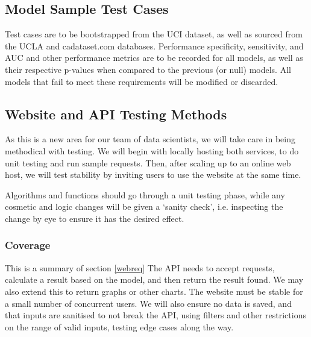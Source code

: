 \documentclass[a4paper, 12pt]{article}
\begin{document}
    \subsection{Model Sample Test Cases}
    Test cases are to be bootstrapped from the UCI dataset, as well as sourced from the UCLA and cadataset.com databases. Performance specificity, sensitivity, and AUC and other performance metrics are to be recorded for all models, as well as their respective p-values when compared to the previous (or null) models. All models that fail to meet these requirements will be modified or discarded.

    \subsection{Website and API Testing Methods} \label{webtest}
    As this is a new area for our team of data scientists, we will take care in being methodical with testing. We will begin with locally hosting both services, to do unit testing and run sample requests. Then, after scaling up to an online web host, we will test stability by inviting users to use the website at the same time. 
    
    Algorithms and functions should go through a unit testing phase, while any cosmetic and logic changes will be given a `sanity check', i.e. inspecting the change by eye to ensure it has the desired effect.
    
        \subsubsection{Coverage}
        This is a summary of section \ref{webreq}
        The API needs to accept requests, calculate a result based on the model, and then return the result found. We may also extend this to return graphs or other charts.
        The website must be stable for a small number of concurrent users. We will also ensure no data is saved, and that inputs are sanitised to not break the API, using filters and other restrictions on the range of valid inputs, testing edge cases along the way.
 
\end{document}
